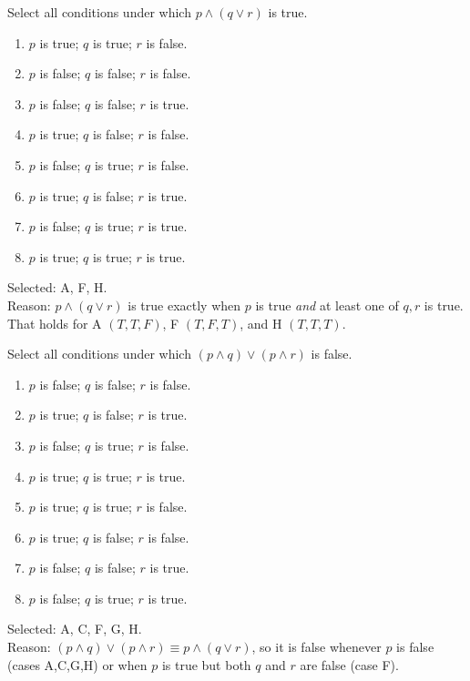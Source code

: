 \begin{enumerate}
  Select all conditions under which $p \wedge (q \vee r)$ is true.
  \begin{enumerate}[label=\Alph*.]
    \item $p$ is true; $q$ is true; $r$ is false.
    \item $p$ is false; $q$ is false; $r$ is false.
    \item $p$ is false; $q$ is false; $r$ is true.
    \item $p$ is true; $q$ is false; $r$ is false.
    \item $p$ is false; $q$ is true; $r$ is false.
    \item $p$ is true; $q$ is false; $r$ is true.
    \item $p$ is false; $q$ is true; $r$ is true.
    \item $p$ is true; $q$ is true; $r$ is true.
  \end{enumerate}
  \begin{subanswer}
    Selected: A, F, H. \\
    Reason: $p \wedge (q \vee r)$ is true exactly when $p$ is true \emph{and} at least one of $q,r$ is true. That holds for A $(T,T,F)$, F $(T,F,T)$, and H $(T,T,T)$.
  \end{subanswer}

  Select all conditions under which $(p \wedge q) \vee (p \wedge r)$ is false.
  \begin{enumerate}[label=\Alph*.]
    \item $p$ is false; $q$ is false; $r$ is false.
    \item $p$ is true; $q$ is false; $r$ is true.
    \item $p$ is false; $q$ is true; $r$ is false.
    \item $p$ is true; $q$ is true; $r$ is true.
    \item $p$ is true; $q$ is true; $r$ is false.
    \item $p$ is true; $q$ is false; $r$ is false.
    \item $p$ is false; $q$ is false; $r$ is true.
    \item $p$ is false; $q$ is true; $r$ is true.
  \end{enumerate}
  \begin{subanswer}
    Selected: A, C, F, G, H. \\
    Reason: $(p\wedge q)\vee(p\wedge r)\equiv p\wedge(q\vee r)$, so it is false whenever $p$ is false (cases A,C,G,H) or when $p$ is true but both $q$ and $r$ are false (case F).
  \end{subanswer}




\end{enumerate}
